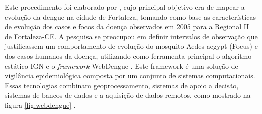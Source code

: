 \begin{figure}[!ht]
	\centering
\end{figure}

Este procedimento foi elaborado por \cite{webdengue2008}, cujo principal objetivo era de mapear a evolução da dengue na cidade de Fortaleza, tomando como base as características de evolução dos casos e focos da doença observados em 2005 para a Regional II de Fortaleza-CE. A pesquisa se preocupou em definir intervalos de observação que justificassem um comportamento de evolução do mosquito Aedes aegypt (Focus) e dos casos humanos da doença, utilizando como ferramenta principal o algoritmo estático IGN e o \textit{framework} WebDengue \cite{webdengue2008}. Este framework é uma solução de vigilância epidemiológica composta por um conjunto de sistemas computacionais. Essas tecnologias combinam geoprocessamento, sistemas de apoio a decisão, sistemas de bancos de dados e a aquisição de dados remotos, como mostrado na figura \ref{fig:webdengue} \cite{webdengue2008}.

